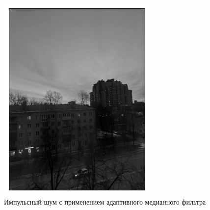 \documentclass[a4paper,12pt]{article}
\begin{document}
\begin{figure}[H]
    \begin{minipage}{0.49\textwidth}
        \centering \includegraphics[width=\textwidth]{results/nlf_sap_5.png}
        \caption{Импульсный шум с применением адаптивного медианного фильтра}
    \end{minipage}\hfill
    \begin{minipage}{0.49\textwidth}

\end{minipage}
\end{figure}
\end{document}
